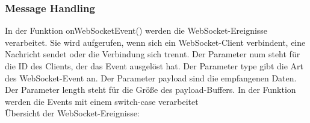 \documentclass[ngerman,12pt,a4paper]{article}
\begin{document}
			\subsubsection{Message Handling}
			
	In der Funktion onWebSocketEvent() werden die WebSocket-Ereignisse verarbeitet. Sie wird aufgerufen, wenn sich ein WebSocket-Client verbindent, eine Nachricht sendet oder die Verbindung sich trennt.
	Der Parameter num steht für die ID des Clients, der das Event ausgelöst hat. Der Parameter type gibt die Art des WebSocket-Event an. Der Parameter payload sind die empfangenen Daten. Der Parameter length steht für die Größe des payload-Buffers. 
	In der Funktion werden die Events mit einem switch-case verarbeitet\\[5cm]
	Übersicht der WebSocket-Ereignisse:
	
\end{document}
